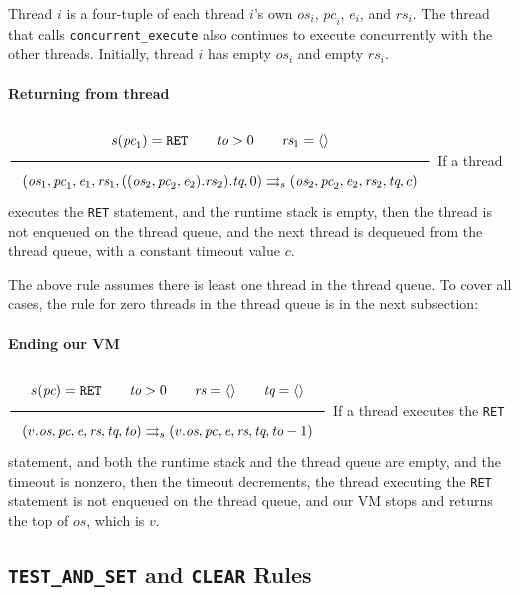 Thread \(i\) is a four-tuple of each thread \(i\)'s own \(\textit{os}_i\), \(\textit{pc}_i\), \(\textit{e}_i\), and \(\textit{rs}_i\). The thread that calls \texttt{concurrent\_execute} also continues to execute concurrently with the other threads. Initially, thread \(i\) has empty \(\textit{os}_i\) and empty \(\textit{rs}_i\).

\paragraph{Returning from thread}
\label{sec:org3702574}
\(\\\Rule{s(\textit{pc}_1) = \texttt{RET} \qquad \textit{to} > 0 \qquad \textit{rs}_1 = \langle \rangle}{(\textit{os}_1, \textit{pc}_1, \textit{e}_1, \textit{rs}_1, ((\textit{os}_2, \textit{pc}_2, \textit{e}_2).\textit{rs}_2).\textit{tq}, 0) \transition (\textit{os}_2, \textit{pc}_2, \textit{e}_2, \textit{rs}_2, \textit{tq}, c)}\\\)
If a thread executes the \texttt{RET} statement, and the runtime stack is empty, then the thread is not enqueued on the thread queue, and the next thread is dequeued from the thread queue, with a constant timeout value \(c\).

The above rule assumes there is least one thread in the thread queue. To cover all cases, the rule for zero threads in the thread queue is in the next subsection:

\paragraph{Ending our VM}
\label{sec:org348adbd}
\(\\\Rule{s(\textit{pc}) = \texttt{RET} \qquad \textit{to} > 0 \qquad \textit{rs} = \langle \rangle \qquad \textit{tq} = \langle \rangle}{(v.\textit{os}, \textit{pc}, \textit{e}, \textit{rs}, \textit{tq}, \textit{to}) \transition (v.\textit{os}, \textit{pc}, \textit{e}, \textit{rs}, \textit{tq}, \textit{to}-1)}\\\)
If a thread executes the \texttt{RET} statement, and both the runtime stack and the thread queue are empty, and the timeout is nonzero, then the timeout decrements, the thread executing the \texttt{RET} statement is not enqueued on the thread queue, and our VM stops and returns the top of \(\textit{os}\), which is \(v\).

\subsection{\texttt{TEST\_AND\_SET} and \texttt{CLEAR} Rules}
\label{sec:org3306985}

